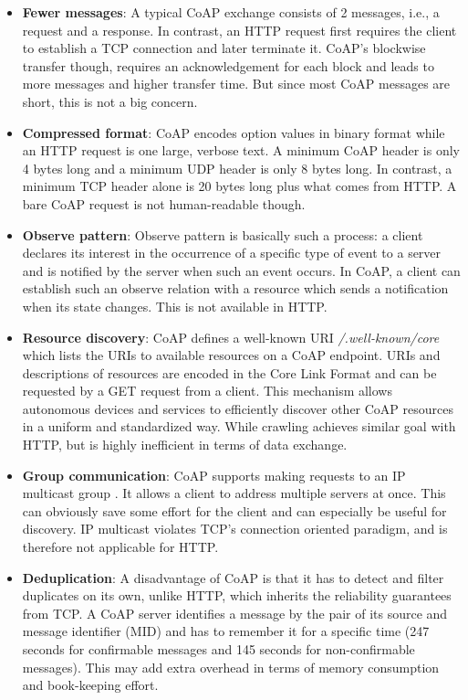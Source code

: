 \begin{itemize}
\item \textbf{Fewer messages}: A typical CoAP exchange consists of 2 messages, i.e., a request and a response. In contrast, an HTTP request first requires the client to establish a TCP connection and later terminate it. CoAP's blockwise transfer\cite{blockwise} though, requires an acknowledgement for each block and leads to more messages and higher transfer time. But since most CoAP messages are short, this is not a big concern.

\item \textbf{Compressed format}: CoAP encodes option values in binary format while an HTTP request is one large, verbose text. A minimum CoAP header is only 4 bytes long and a minimum UDP header is only 8 bytes long. In contrast, a minimum TCP header alone is 20 bytes long plus what comes from HTTP. A bare CoAP request is not human-readable though.

\item \textbf{Observe pattern}: Observe pattern is basically such a process: a client declares its interest in the occurrence of a specific type of event to a server and is notified by the server when such an event occurs. In CoAP, a client can establish such an observe relation with a resource which sends a notification when its state changes. This is not available in HTTP.

\item \textbf{Resource discovery}: CoAP defines a well-known URI \textit{/.well-known/core} which lists the URIs to available resources on a CoAP endpoint. URIs and descriptions of resources are encoded in the Core Link Format \cite{core} and can be requested by a GET request from a client. This mechanism allows autonomous devices and services to efficiently discover other CoAP resources in a uniform and standardized way. While crawling achieves similar goal with HTTP, but is highly inefficient in terms of data exchange.

\item \textbf{Group communication}: CoAP supports making requests to an IP multicast group \cite{coap_protocol}. It allows a client to address multiple servers at once. This can obviously save some effort for the client and can especially be useful for discovery. IP multicast violates TCP's connection oriented paradigm, and is therefore not applicable for HTTP.

\item \textbf{Deduplication}: A disadvantage of CoAP is that it has to detect and filter duplicates on its own, unlike HTTP, which inherits the reliability guarantees from TCP. A CoAP server identifies a message by the pair of its source and message identifier (MID) and has to remember it for a specific time (247 seconds for confirmable messages and 145 seconds for non-confirmable messages). This may add extra overhead in terms of memory consumption and book-keeping effort.
\end{itemize}

